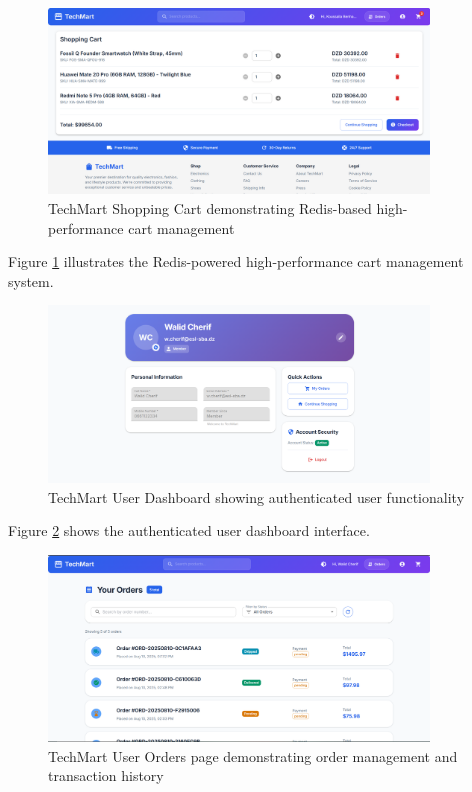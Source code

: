 \begin{figure}[H]
\centering
\includegraphics[width=0.9\textwidth]{figures/chapter5/techmart-shopping-cart.png}
\caption{TechMart Shopping Cart demonstrating Redis-based high-performance cart management}
\label{fig:techmart-shopping-cart}
\end{figure}

Figure \ref{fig:techmart-shopping-cart} illustrates the Redis-powered high-performance cart management system.

\begin{figure}[H]
\centering
\includegraphics[width=0.9\textwidth]{figures/chapter5/techmart-user-dashboard.png}
\caption{TechMart User Dashboard showing authenticated user functionality}
\label{fig:techmart-user-dashboard}
\end{figure}

Figure \ref{fig:techmart-user-dashboard} shows the authenticated user dashboard interface.

\begin{figure}[H]
\centering
\includegraphics[width=0.9\textwidth]{figures/chapter5/techmart-user-orders.png}
\caption{TechMart User Orders page demonstrating order management and transaction history}
\label{fig:techmart-user-orders}
\end{figure}

